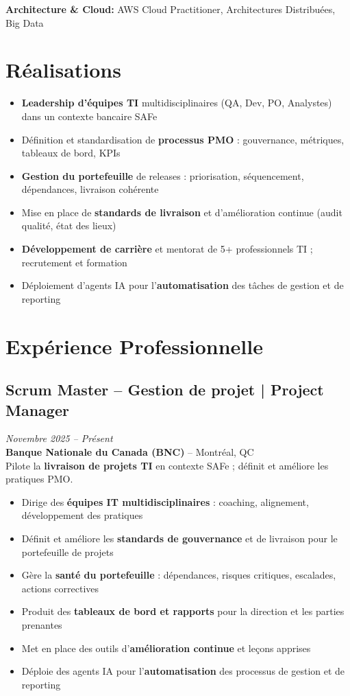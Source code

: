 \documentclass[11pt,a4paper]{article}
\begin{document}
\textbf{Architecture \& Cloud:} AWS Cloud Practitioner, Architectures Distribuées, Big Data

\vspace{6pt}

\section*{Réalisations}
\begin{itemize}
    \item \textbf{Leadership d'équipes TI} multidisciplinaires (QA, Dev, PO, Analystes) dans un contexte bancaire SAFe
    \item Définition et standardisation de \textbf{processus PMO} : gouvernance, métriques, tableaux de bord, KPIs
    \item \textbf{Gestion du portefeuille} de releases : priorisation, séquencement, dépendances, livraison cohérente
    \item Mise en place de \textbf{standards de livraison} et d'amélioration continue (audit qualité, état des lieux)
    \item \textbf{Développement de carrière} et mentorat de 5+ professionnels TI ; recrutement et formation
    \item Déploiement d'agents IA pour l'\textbf{automatisation} des tâches de gestion et de reporting
\end{itemize}

\section*{Expérience Professionnelle}

\subsection*{Scrum Master -- Gestion de projet | Project Manager} \hfill \textit{Novembre 2025 -- Présent}\\
\textbf{Banque Nationale du Canada (BNC)} -- Montréal, QC\\
Pilote la \textbf{livraison de projets TI} en contexte SAFe ; définit et améliore les pratiques PMO.
\begin{itemize}
    \item Dirige des \textbf{équipes IT multidisciplinaires} : coaching, alignement, développement des pratiques
    \item Définit et améliore les \textbf{standards de gouvernance} et de livraison pour le portefeuille de projets
    \item Gère la \textbf{santé du portefeuille} : dépendances, risques critiques, escalades, actions correctives
    \item Produit des \textbf{tableaux de bord et rapports} pour la direction et les parties prenantes
    \item Met en place des outils d'\textbf{amélioration continue} et leçons apprises
    \item Déploie des agents IA pour l'\textbf{automatisation} des processus de gestion et de reporting
\end{itemize}
\end{document}
